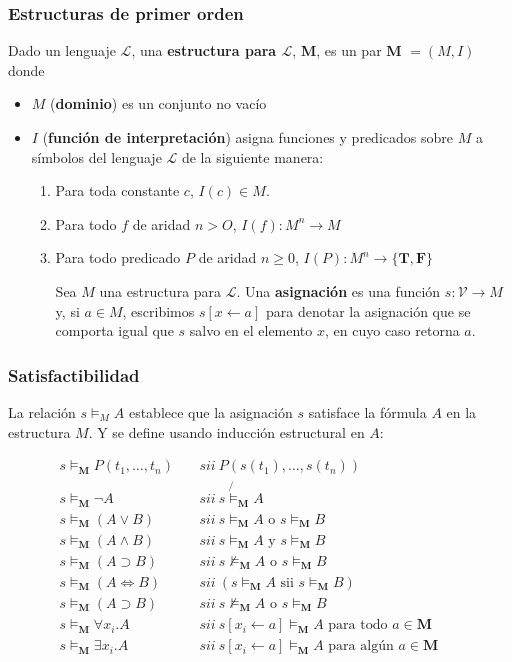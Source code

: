 \subsubsection{Estructuras de primer orden}
Dado un lenguaje $\mathcal{L}$, una \textbf{estructura para $\mathcal{L}$}, \textbf{M}, es un par \textbf{M} $=(M, I)$ donde 
\begin{itemize}
\item $M$ (\textbf{dominio}) es un conjunto no vacío
\item $I$ (\textbf{función de interpretación}) asigna funciones y predicados sobre $M$ a símbolos del lenguaje $\mathcal{L}$ de la siguiente manera:
\begin{enumerate}
\item Para toda constante $c$, $I(c)\in M$.
\item Para todo $f$ de aridad $n > O$, $I(f):M^n\to M$
\item Para todo predicado $P$ de aridad $n \geq 0$, $I(P) : M^n \to\{\textbf{T}, \textbf{F}\}$

Sea $M$ una estructura para $\mathcal{L}$. Una \textbf{asignación} es una función $s:\mathcal{V}\to M$ y, si $a\in M$, escribimos $s[x \leftarrow a]$ para denotar la asignación que se comporta igual que $s$ salvo en el elemento $x$, en cuyo caso retorna $a$.
\end{enumerate}
\end{itemize}

\subsubsection{Satisfactibilidad}
La relación $s \models_M A$ establece que la asignación $s$ satisface la fórmula $A$ en la estructura $M$. Y se define usando inducción estructural en $A$:

\begin{align*}
&s \models_\textbf{M} P(t_1,\dots,t_n)&&~sii~P(s(t_1),\dots,s(t_n))&&&\\
&s \models_\textbf{M} \lnot A &&~sii ~s \not{\models}_\textbf{M} A &&&\\
&s \models_\textbf{M} (A \lor B)&&~sii~s \models_\textbf{M} A \text{ o } s\models_\textbf{M} B&&&\\
&s \models_\textbf{M} (A \land B)&&~sii~s \models_\textbf{M} A \text{ y } s\models_\textbf{M} B&&&\\
&s \models_\textbf{M} (A \supset B)&&~sii~s\not\models_\textbf{M} A \text{ o } s\models_\textbf{M} B&&&\\
&s \models_\textbf{M} (A \iff B)&&~sii~(s\models_\textbf{M} A \text{ sii } s\models_\textbf{M} B)&&&\\
&s \models_\textbf{M} (A \supset B)&&~sii~s\not\models_\textbf{M} A \text{ o } s\models_\textbf{M} B&&&\\
&s \models_\textbf{M} \forall x_i.A &&~sii~s[x_i\leftarrow a]\models_\textbf{M} A \text{ para todo } a\in \textbf{M}&&&\\
&s \models_\textbf{M} \exists x_i.A &&~sii~s[x_i\leftarrow a]\models_\textbf{M} A \text{ para algún } a\in \textbf{M}&&&\\
\end{align*}

